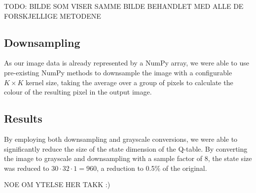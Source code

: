 TODO: BILDE SOM VISER SAMME BILDE BEHANDLET MED ALLE DE FORSKJELLIGE METODENE

\subsection{Downsampling}

As our image data is already represented by a NumPy array, we were able to use pre-existing NumPy methods to downsample the image with a configurable $K \times K$ kernel size, taking the average over a group of pixels to calculate the colour of the resulting pixel in the output image.

\subsection{Results}

By employing both downsampling and grayscale conversions, we were able to significantly reduce the size of the state dimension of the Q-table. By converting the image to grayscale and downsampling with a sample factor of 8, the state size was reduced to $30 \cdot 32 \cdot 1 = 960$, a reduction to 0.5\% of the original.

NOE OM YTELSE HER TAKK :)
